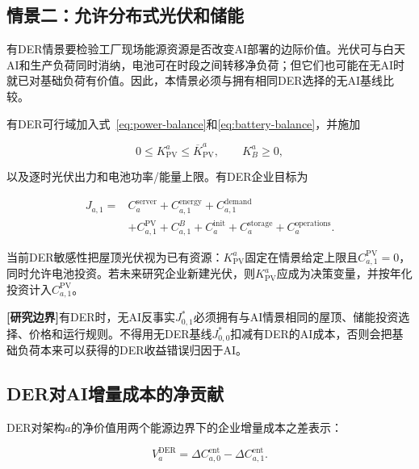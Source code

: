 \documentclass[preprint]{elsarticle}
\newcommand{\boundary}{\textcolor{black!65}{\textbf{[研究边界]}}}
\begin{document}
\subsection{情景二：允许分布式光伏和储能}

有DER情景要检验工厂现场能源资源是否改变AI部署的边际价值。光伏可与白天AI和生产负荷同时消纳，电池可在时段之间转移净负荷；但它们也可能在无AI时就已对基础负荷有价值。因此，本情景必须与拥有相同DER选择的无AI基线比较。

有DER可行域加入式~\eqref{eq:power-balance}和\eqref{eq:battery-balance}，并施加

\begin{equation}
 0\leq K^a_{\mathrm{PV}}\leq\overline K^a_{\mathrm{PV}},
 \qquad K^a_B\geq0,
 \label{eq:der-domain}
\end{equation}

以及逐时光伏出力和电池功率/能量上限。有DER企业目标为

\begin{equation}
\begin{aligned}
 J_{a,1}={}&C_a^{\mathrm{server}}
 +C_{a,1}^{\mathrm{energy}}+C_{a,1}^{\mathrm{demand}}\\
 &+C_{a,1}^{\mathrm{PV}}+C_{a,1}^{B}
 +C_a^{\mathrm{init}}+C_a^{\mathrm{storage}}
 +C_a^{\mathrm{operations}}.
\end{aligned}
 \label{eq:enterprise-with-der}
\end{equation}

当前DER敏感性把屋顶光伏视为已有资源：$K^a_{\mathrm{PV}}$固定在情景给定上限且$C_{a,1}^{\mathrm{PV}}=0$，同时允许电池投资。若未来研究企业新建光伏，则$K^a_{\mathrm{PV}}$应成为决策变量，并按年化投资计入$C_{a,1}^{\mathrm{PV}}$。

\boundary 有DER时，无AI反事实$J_{0,1}^{*}$必须拥有与AI情景相同的屋顶、储能投资选择、价格和运行规则。不得用无DER基线$J_{0,0}^{*}$扣减有DER的AI成本，否则会把基础负荷本来可以获得的DER收益错误归因于AI。

\subsection{DER对AI增量成本的净贡献}

DER对架构$a$的净价值用两个能源边界下的企业增量成本之差表示：

\begin{equation}
 V^{\mathrm{DER}}_a
 =\Delta C^{\mathrm{ent}}_{a,0}
 -\Delta C^{\mathrm{ent}}_{a,1}.
 \label{eq:der-difference-in-differences}
\end{equation}
\end{document}
